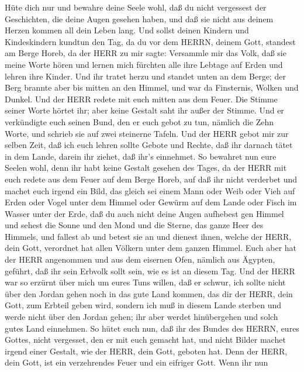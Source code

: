  Hüte dich nur und bewahre deine Seele wohl, daß du nicht
vergessest der Geschichten, die deine Augen gesehen haben, und daß sie
nicht aus deinem Herzen kommen all dein Leben lang. Und sollst deinen
Kindern und Kindeskindern kundtun  den Tag, da du vor dem
HERRN, deinem Gott, standest am Berge Horeb, da der HERR zu mir sagte:
Versammle mir das Volk, daß sie meine Worte hören und lernen mich
fürchten alle ihre Lebtage auf Erden und lehren ihre Kinder.
 Und ihr tratet herzu und standet unten an dem Berge; der
Berg brannte aber bis mitten an den Himmel, und war da Finsternis,
Wolken und Dunkel.  Und der HERR redete mit euch mitten aus
dem Feuer. Die Stimme seiner Worte hörtet ihr; aber keine Gestalt saht
ihr außer der Stimme.  Und er verkündigte euch seinen Bund,
den er euch gebot zu tun, nämlich die Zehn Worte, und schrieb sie auf
zwei steinerne Tafeln.  Und der HERR gebot mir zur selben
Zeit, daß ich euch lehren sollte Gebote und Rechte, daß ihr darnach
tätet in dem Lande, darein ihr ziehet, daß ihr's einnehmet.
 So bewahret nun eure Seelen wohl, denn ihr habt keine
Gestalt gesehen des Tages, da der HERR mit euch redete aus dem Feuer auf
dem Berge Horeb,  auf daß ihr nicht verderbet und machet
euch irgend ein Bild, das gleich sei einem Mann oder Weib 
oder Vieh auf Erden oder Vogel unter dem Himmel  oder
Gewürm auf dem Lande oder Fisch im Wasser unter der Erde, 
daß du auch nicht deine Augen aufhebest gen Himmel und sehest die Sonne
und den Mond und die Sterne, das ganze Heer des Himmels, und fallest ab
und betest sie an und dienest ihnen, welche der HERR, dein Gott,
verordnet hat allen Völkern unter dem ganzen Himmel.  Euch
aber hat der HERR angenommen und aus dem eisernen Ofen, nämlich aus
Ägypten, geführt, daß ihr sein Erbvolk sollt sein, wie es ist an diesem
Tag.  Und der HERR war so erzürnt über mich um eures Tuns
willen, daß er schwur, ich sollte nicht über den Jordan gehen noch in
das gute Land kommen, das dir der HERR, dein Gott, zum Erbteil geben
wird,  sondern ich muß in diesem Lande sterben und werde
nicht über den Jordan gehen; ihr aber werdet hinübergehen und solch
gutes Land einnehmen.  So hütet euch nun, daß ihr des
Bundes des HERRN, eures Gottes, nicht vergesset, den er mit euch gemacht
hat, und nicht Bilder machet irgend einer Gestalt, wie der HERR, dein
Gott, geboten hat.  Denn der HERR, dein Gott, ist ein
verzehrendes Feuer und ein eifriger Gott.  Wenn ihr nun
